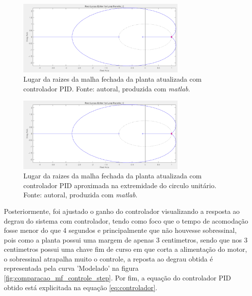 \documentclass{ifacconf}
\begin{document}
\begin{figure}[!htb]
  \begin{center}
  \includegraphics[width=8.4cm]{figures/lugar_raizes_controlador_finalpng.png}    %
  \caption{Lugar da raizes da malha fechada da planta atualizada com controlador PID. Fonte: autoral, produzida com \textit{matlab}.} 
  \label{fig:lugar_raizes_mf_atualizada_controlador}
  \end{center}
\end{figure}


\begin{figure}[!htb]
  \begin{center}
  \includegraphics[width=8.4cm]{figures/lugar_raizes_controlador_finalpng.png}    %
  \caption{Lugar da raizes da malha fechada da planta atualizada com controlador PID aproximada na extremidade do circulo unitário. Fonte: autoral, produzida com \textit{matlab}.} 
  \label{fig:lugar_raizes_mf_atualizada_controlador_zoom}
  \end{center}
\end{figure}

Posteriormente, foi ajustado o ganho do controlador visualizando a resposta ao degrau do sistema com controlador, tendo como foco que o tempo de acomodação
fosse menor do que 4 segundos e principalmente que não houvesse sobressinal, pois como a planta possui uma margem de apenas 3 centimetros, sendo que nos 3 centimetros
possui uma chave fim de curso em que corta a alimentação do motor, o sobressinal atrapalha muito o controle, a reposta ao degrau obtida é representada pela curva 'Modelado' na figura \ref{fig:comparacao_mf_controle_step}.
Por fim, a equação do controlador PID obtido está explicitada na equação \ref{eq:controlador}.
\end{document}
